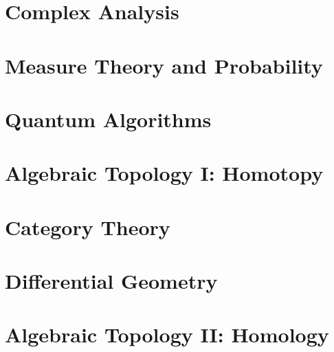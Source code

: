 \documentclass[11pt,twoside=semi,openright,numbers=noenddot]{scrreprt}
\begin{document}
\part{Complex Analysis}




\part{Measure Theory and Probability}











\part{Quantum Algorithms}




\part{Algebraic Topology I: Homotopy}



\part{Category Theory}


\part{Differential Geometry}



\part{Algebraic Topology II: Homology}




\end{document}
